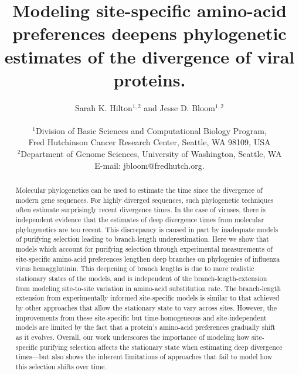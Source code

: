 \documentclass[11pt]{article}
\title{Modeling site-specific amino-acid preferences deepens phylogenetic estimates of the divergence of viral proteins.}
\author
{Sarah K. Hilton$^{1,2}$  and Jesse D. Bloom$^{1,2}$\\
\\
\normalsize{$^1$Division of Basic Sciences and Computational Biology Program,}\\
\normalsize{Fred Hutchinson Cancer Research Center, Seattle, WA 98109, USA}\\
\normalsize{$^2$Department of Genome Sciences, University of Washington, Seattle, WA}\\
\normalsize{E-mail:  jbloom@fredhutch.org.}\\
}
\date{}
\begin{document}
 


\maketitle 


\begin{abstract}
\noindent  
Molecular phylogenetics can be used to estimate the time since the divergence of modern gene sequences.
For highly diverged sequences, such phylogenetic techniques often estimate surprisingly recent divergence times. 
In the case of viruses, there is independent evidence that the estimates of deep divergence times from molecular phylogenetics are too recent.
This discrepancy is caused in part by inadequate models of purifying selection leading to branch-length underestimation.
Here we show that models which account for purifying selection through experimental measurements of site-specific amino-acid preferences lengthen deep branches on phylogenies of influenza virus hemagglutinin.
This deepening of branch lengths is due to more realistic stationary states of the models, and is independent of the branch-length-extension from modeling site-to-site variation in amino-acid substitution rate.
The branch-length extension from experimentally informed site-specific models is similar to that achieved by other approaches that allow the stationary state to vary across sites.
However, the improvements from these site-specific but time-homogeneous and site-independent models are limited by the fact that a protein's amino-acid preferences gradually shift as it evolves.
Overall, our work underscores the importance of modeling how site-specific purifying selection affects the stationary state when estimating deep divergence times---but also shows the inherent limitations of approaches that fail to model how this selection shifts over time. 
\end{abstract}

\clearpage
\end{document}
